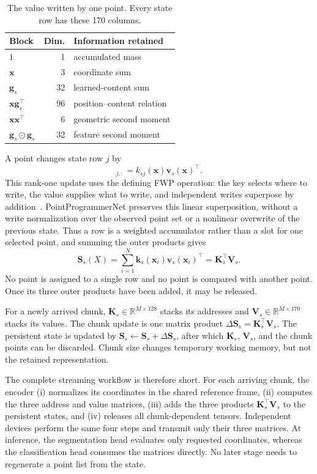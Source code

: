 \documentclass[11pt,a4paper]{article}
\newcommand{\R}{\mathbb{R}}
\newcommand{\Sstate}{\mathbf{S}}
\begin{document}
\begin{table}[t]
\centering
\caption{The value written by one point. Every state row has these 170 columns.}
\label{tab:value-layout-main}
\begin{tabular}{lrl}
\toprule
Block & Dim. & Information retained \\
\midrule
$1$ & 1 & accumulated mass \\
$\bm x$ & 3 & coordinate sum \\
$\bm g_s$ & 32 & learned-content sum \\
$\bm x\bm g_s^\top$ & 96 & position--content relation \\
$\bm x\bm x^\top$ & 6 & geometric second moment \\
$\bm g_s\odot\bm g_s$ & 32 & feature second moment \\
\bottomrule
\end{tabular}
\end{table}
A point changes state row $j$ by
\begin{equation}
[\Delta\Sstate_s(\bm x)]_{j,:}=k_{sj}(\bm x)\bm v_s(\bm x)^\top .
\label{eq:single-write-main}
\end{equation}
This rank-one update uses the defining FWP operation: the key selects where to write, the value supplies what to write, and independent writes superpose by addition~\cite{schlag2021linear}. PointProgrammerNet preserves this linear superposition, without a write normalization over the observed point set or a nonlinear overwrite of the previous state. Thus a row is a weighted accumulator rather than a slot for one selected point, and summing the outer products gives
\begin{equation}
\Sstate_s(X)=\sum_{i=1}^{N}\bm k_s(\bm x_i)\bm v_s(\bm x_i)^\top
=\bm K_s^\top\bm V_s.
\label{eq:state-main}
\end{equation}
No point is assigned to a single row and no point is compared with another point. Once its three outer products have been added, it may be released.

For a newly arrived chunk, $\bm K_s\in\R^{M\times128}$ stacks its addresses and $\bm V_s\in\R^{M\times170}$ stacks its values. The chunk update is one matrix product $\Delta\Sstate_s=\bm K_s^\top\bm V_s$. The persistent state is updated by $\Sstate_s\leftarrow\Sstate_s+\Delta\Sstate_s$, after which $\bm K_s$, $\bm V_s$, and the chunk points can be discarded. Chunk size changes temporary working memory, but not the retained representation.

The complete streaming workflow is therefore short. For each arriving chunk, the encoder (i) normalizes its coordinates in the shared reference frame, (ii) computes the three address and value matrices, (iii) adds the three products $\bm K_s^\top\bm V_s$ to the persistent states, and (iv) releases all chunk-dependent tensors. Independent devices perform the same four steps and transmit only their three matrices. At inference, the segmentation head evaluates only requested coordinates, whereas the classification head consumes the matrices directly. No later stage needs to regenerate a point list from the state.
\end{document}
